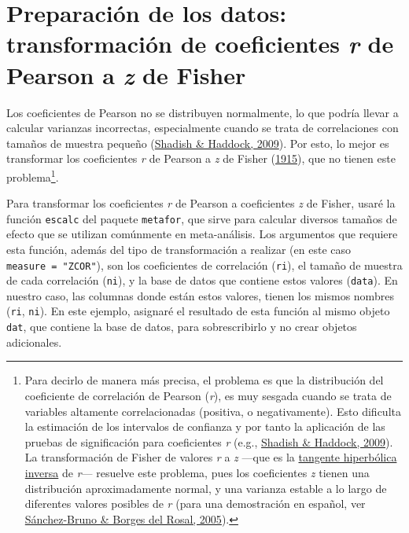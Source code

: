 \documentclass[
  bookmarksnumbered]{article}
\begin{document}
\hypertarget{preparaciuxf3n-de-los-datos-transformaciuxf3n-de-coeficientes-r-de-pearson-a-z-de-fisher}{%
\section{\texorpdfstring{Preparación de los datos: transformación de coeficientes \emph{r} de Pearson a \emph{z} de Fisher}{Preparación de los datos: transformación de coeficientes r de Pearson a z de Fisher}}\label{preparaciuxf3n-de-los-datos-transformaciuxf3n-de-coeficientes-r-de-pearson-a-z-de-fisher}}

Los coeficientes de Pearson no se distribuyen normalmente, lo que podría llevar a calcular varianzas incorrectas, especialmente cuando se trata de correlaciones con tamaños de muestra pequeño (\protect\hyperlink{ref-shadishCombiningEstimatesEffect2009}{Shadish \& Haddock, 2009}). Por esto, lo mejor es transformar los coeficientes \emph{r} de Pearson a \emph{z} de Fisher (\protect\hyperlink{ref-fisherFrequencyDistributionValues1915}{1915}), que no tienen este problema\footnote{Para decirlo de manera más precisa, el problema es que la distribución del coeficiente de correlación de Pearson (\emph{r}), es muy sesgada cuando se trata de variables altamente correlacionadas (positiva, o negativamente). Esto dificulta la estimación de los intervalos de confianza y por tanto la aplicación de las pruebas de significación para coeficientes \emph{r} (e.g., \protect\hyperlink{ref-shadishCombiningEstimatesEffect2009}{Shadish \& Haddock, 2009}). La transformación de Fisher de valores \emph{r} a \emph{z} ---que es la \href{https://es.wikipedia.org/wiki/Tangente_hiperb\%C3\%B3lica}{tangente hiperbólica inversa} de \emph{r}--- resuelve este problema, pues los coeficientes \emph{z} tienen una distribución aproximadamente normal, y una varianza estable a lo largo de diferentes valores posibles de \emph{r} (para una demostración en español, ver \protect\hyperlink{ref-sanchez-brunoTransformacionFisherPara2005}{Sánchez-Bruno \& Borges del Rosal, 2005}).}.

Para transformar los coeficientes \emph{r} de Pearson a coeficientes \emph{z} de Fisher, usaré la función \texttt{escalc} del paquete \texttt{metafor}, que sirve para calcular diversos tamaños de efecto que se utilizan comúnmente en meta-análisis. Los argumentos que requiere esta función, además del tipo de transformación a realizar (en este caso \texttt{measure\ =\ "ZCOR"}), son los coeficientes de correlación (\texttt{ri}), el tamaño de muestra de cada correlación (\texttt{ni}), y la base de datos que contiene estos valores (\texttt{data}). En nuestro caso, las columnas donde están estos valores, tienen los mismos nombres (\texttt{ri}, \texttt{ni}). En este ejemplo, asignaré el resultado de esta función al mismo objeto \texttt{dat}, que contiene la base de datos, para sobrescribirlo y no crear objetos adicionales.
\end{document}
